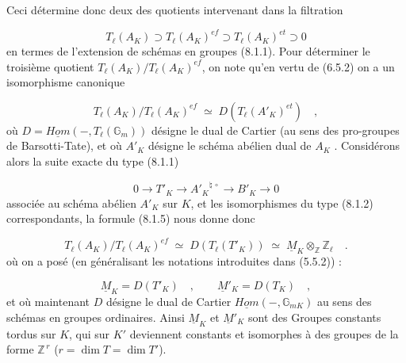 
Ceci détermine donc deux des quotients intervenant dans la filtration

\begin{equation}\tag{8.1.4}
T_\ell(A_K) \supset T_\ell(A_K)^{ef} \supset T_\ell(A_K)^{et} \supset 0
\end{equation}
en termes de l'extension de schémas en groupes (8.1.1). Pour déterminer le troisième quotient $T_\ell(A_K)/T_\ell(A_K)^{ef}$, on note qu'en vertu de (6.5.2) on a un isomorphisme canonique

\begin{equation}\tag{8.1.5}
T_\ell(A_K)/T_\ell(A_K)^{ef} \;\simeq\; D(T_\ell(A'_K)^{et}) \quad ,
\end{equation}
où $D = \underline{Hom}( - , T_\ell(\mathbb{G}_m))$ désigne le dual de Cartier (au sens des pro-groupes de Barsotti-Tate), et où $A'_K$ désigne le schéma abélien dual de $A_K$ . Considérons alors la suite exacte du type (8.1.1)

\begin{equation}\tag{8.1.6}
0 \longrightarrow T'_K \longrightarrow {A'_K}^{\natural\,\circ} \longrightarrow B'_K \longrightarrow 0
\end{equation}
associée au schéma abélien $A'_K$ sur $K$, et les isomorphismes du type (8.1.2) correspondants, la formule (8.1.5) nous donne donc

\begin{equation}\tag{8.1.7}
T_\ell(A_K)/T_\ell(A_K)^{ef} \;\simeq\; D(T_\ell(T'_K)) \;\simeq\; \underline{M}_K \otimes_{\mathbb{Z}} \mathbb{Z}_\ell \quad .
\end{equation}
où on a posé (en généralisant les notations introduites dans (5.5.2)) :

\begin{equation}\tag{8.1.8}
\underline{M}_K = D(T'_K) \quad , \qquad \underline{M}'_K = D(T_K) \quad ,
\end{equation}
et où maintenant $D$ désigne le dual de Cartier $\underline{Hom}( - , \mathbb{G}_{mK})$ au sens des schémas en groupes ordinaires. Ainsi $\underline{M}_K$ et $\underline{M}'_K$ sont des Groupes constants tordus sur $K$, qui sur $K'$ deviennent constants et isomorphes à des groupes de la forme $\mathbb{Z}^{\,r}$ ($r=\dim T = \dim T'$).



